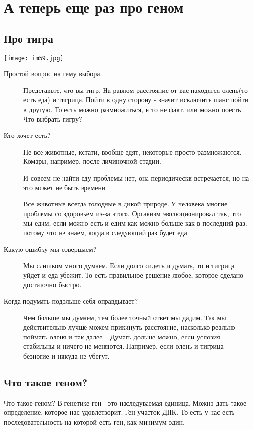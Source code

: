 ﻿\section{А теперь еще раз про геном}
\subsection{Про тигра}
\texttt{[image: im59.jpg]}
\begin{description}
\item[Простой вопрос на тему выбора.] 
Представьте, что вы тигр. На равном расстояние от 
вас находятся олень(то есть еда) и тигрица. Пойти в одну 
сторону - значит исключить шанс пойти в другую. То есть 
можно размножиться, и то не факт, или можно поесть. Что 
выбрать тигру? 

\item[Кто хочет есть?]
Не все животные, кстати, вообще едят, некоторые просто размножаются. 
Комары, например, после личиночной стадии. 

И совсем не найти еду проблемы нет, она периодически встречается, 
но на это может не быть времени. 

Все животные всегда голодные в дикой природе. У человека многие 
проблемы со здоровьем из-за этого. Организм эволюционировал так, 
что мы едим, если можно есть и едим как можно больше как в 
последний раз, потому что не знаем, когда в следующий раз будет еда. 

\item[Какую ошибку мы совершаем?] Мы слишком много думаем. Если долго 
сидеть и думать, то и тигрица уйдет и еда убежит. То есть 
правильное решение любое, которое сделано достаточно быстро. 

\item[Когда подумать подольше себя оправдывает?] 
Чем больше мы думаем, тем более точный ответ мы дадим. 
Так мы действительно лучше можем прикинуть расстояние, 
насколько реально поймать оленя и так далее... Думать 
дольше можно, если условия стабильны и ничего не меняются. 
Например, если олень и тигрица безногие и никуда не убегут. 
\end{description}
\subsection{Что такое геном?}
Что такое геном? 
В генетике ген - это наследуваемая единица. Можно 
дать такое определение, которое нас удовлетворит. Ген 
участок ДНК. То есть у нас есть последовательность 
на которой есть ген, как минимум один. 

